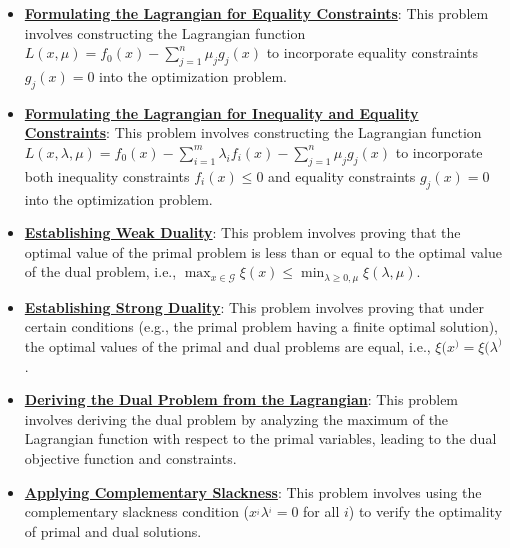 \documentclass{article}%
\begin{document}
\begin{itemize}[leftmargin=*]%
\item \href{https://www.math.purdue.edu/~yipn/421//2024-09-17-DualityGeneral.pdf#page=2}{\textbf{Formulating the Lagrangian for Equality Constraints}}: This problem involves constructing the Lagrangian function $L(x, \mu) = f_0(x) - \sum_{j=1}^n \mu_j g_j(x)$ to incorporate equality constraints $g_j(x) = 0$ into the optimization problem.%
\item \href{https://www.math.purdue.edu/~yipn/421//2024-09-17-DualityGeneral.pdf#page=7}{\textbf{Formulating the Lagrangian for Inequality and Equality Constraints}}: This problem involves constructing the Lagrangian function $L(x, \lambda, \mu) = f_0(x) - \sum_{i=1}^m \lambda_i f_i(x) - \sum_{j=1}^n \mu_j g_j(x)$ to incorporate both inequality constraints $f_i(x) \le 0$ and equality constraints $g_j(x) = 0$ into the optimization problem.%
\item \href{https://www.math.purdue.edu/~yipn/421//2024-09-17-DualityGeneral.pdf#page=5}{\textbf{Establishing Weak Duality}}: This problem involves proving that the optimal value of the primal problem is less than or equal to the optimal value of the dual problem, i.e., $\max_{x \in \mathcal{G}} \xi(x) \le \min_{\lambda \ge 0, \mu} \xi(\lambda, \mu)$.%
\item \href{https://www.math.purdue.edu/~yipn/421//2024-09-17-DualityGeneral.pdf#page=17}{\textbf{Establishing Strong Duality}}: This problem involves proving that under certain conditions (e.g., the primal problem having a finite optimal solution), the optimal values of the primal and dual problems are equal, i.e., $\xi(x^) = \xi(\lambda^)$.%
\item \href{https://www.math.purdue.edu/~yipn/421//2024-09-17-DualityGeneral.pdf#page=15}{\textbf{Deriving the Dual Problem from the Lagrangian}}: This problem involves deriving the dual problem by analyzing the maximum of the Lagrangian function with respect to the primal variables, leading to the dual objective function and constraints.%
\item \href{https://www.math.purdue.edu/~yipn/421//2024-09-17-DualityGeneral.pdf#page=22}{\textbf{Applying Complementary Slackness}}: This problem involves using the complementary slackness condition ($x^_i \lambda^_i = 0$ for all $i$) to verify the optimality of primal and dual solutions.%
\end{itemize}%
\end{document}
